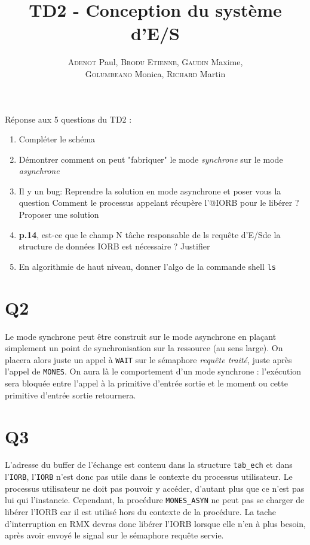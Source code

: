 


\title{TD2 - Conception du système d'E/S}

\author{\textsc{Adenot} Paul, \textsc{Brodu Etienne}, \textsc{Gaudin} Maxime,\\ \textsc{Golumbeano} Monica, \textsc{Richard} Martin}


\maketitle
\tableofcontents 

\begin{nAbstract}
Réponse aux 5 questions du TD2 :
\begin{enumerate}
	\item Compléter le schéma
	\item Démontrer comment on peut "fabriquer" le mode \textsl{synchrone} sur le mode \textsl{asynchrone}
	\item \og Il y un bug\fg : Reprendre la solution en mode asynchrone et poser vous la question \og Comment le processus 
		appelant récupère l'@IORB pour le libérer ? Proposer une solution
	\item \textbf{p.14}, est-ce que le champ \og N tâche responsable de ls requête d'E/S\fg de la structure de données IORB 
	est nécessaire ? Justifier
   \item En algorithmie de haut niveau, donner l'algo de la commande shell \texttt{ls}	
\end{enumerate}
\end{nAbstract}

\newpage
\section{Q2}
Le mode synchrone peut être construit sur le mode asynchrone en plaçant
simplement un point de synchronisation sur la ressource (au sens large).
On placera alors juste un appel à \texttt{WAIT} sur le sémaphore \emph{requête
traité}, juste après l'appel de \texttt{MONES}. On aura là le comportement
d'un mode synchrone : l'exécution sera bloquée entre l'appel à la primitive
d'entrée sortie et le moment ou cette primitive d'entrée sortie retournera.


\section{Q3}
L'adresse du buffer de l'échange est contenu dans la structure \texttt{tab\_ech} et dans l'\texttt{IORB}, 
l'\texttt{IORB} n'est donc pas utile dans le contexte du processus utilisateur.
Le processus utilisateur ne doit pas pouvoir y accéder, d'autant plus que ce n'est pas lui qui l'instancie.
Cependant, la procédure \texttt{MONES\_ASYN} ne peut pas se charger de libérer l'IORB car il est utilisé hors du contexte de
la procédure.
La tache d'interruption en RMX devras donc libérer l'IORB lorsque elle n'en à plus besoin, après avoir envoyé
le signal sur le sémaphore requête servie.\\

